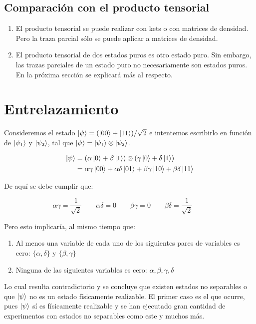 \subsection{Comparación con el producto tensorial}

\begin{enumerate}
    \item El producto tensorial se puede realizar con kets o con matrices de densidad. Pero la traza parcial sólo se puede aplicar a matrices de densidad.
    \item El producto tensorial de dos estados puros es otro estado puro. Sin embargo, las trazas parciales de un estado puro no necesariamente son estados puros. En la próxima sección se explicará más al respecto.
\end{enumerate}

\section{Entrelazamiento}

Consideremos el estado $\ket{\psi} = (\ket{00} + \ket{11})/\sqrt{2}$ e intentemos escribirlo en función de $\ket{\psi_1}$ y $\ket{\psi_2}$, tal que $\ket{\psi} = \ket{\psi_1} \otimes \ket{\psi_2}$.

\begin{align*}
    \ket{\psi}
    &= (\alpha \ket{0} + \beta \ket{1}) \otimes (\gamma \ket{0} + \delta \ket{1}) \\
    &= \alpha \gamma \ket{00} + \alpha \delta \ket{01} + \beta \gamma \ket{10} + \beta \delta \ket{11}
\end{align*}

De aquí se debe cumplir que:

$$
    \alpha \gamma = \frac{1}{\sqrt{2}} \qquad
    \alpha \delta = 0 \qquad
    \beta \gamma = 0 \qquad
    \beta \delta = \frac{1}{\sqrt{2}} \qquad
$$

Pero esto implicaría, al mismo tiempo que:

\begin{enumerate}
    \item Al menos una variable de cada uno de los siguientes pares de variables es cero: $\{\alpha, \delta\}$ y $\{\beta, \gamma\}$
    \item Ninguna de las siguientes variables es cero: $\alpha, \beta, \gamma, \delta$
\end{enumerate}

Lo cual resulta contradictorio y se concluye que existen estados no separables o que $\ket{\psi}$ no es un estado físicamente realizable. El primer caso es el que ocurre, pues $\ket{\psi}$ sí es físicamente realizable y se han ejecutado gran cantidad de experimentos con estados no separables como este y muchos más.

